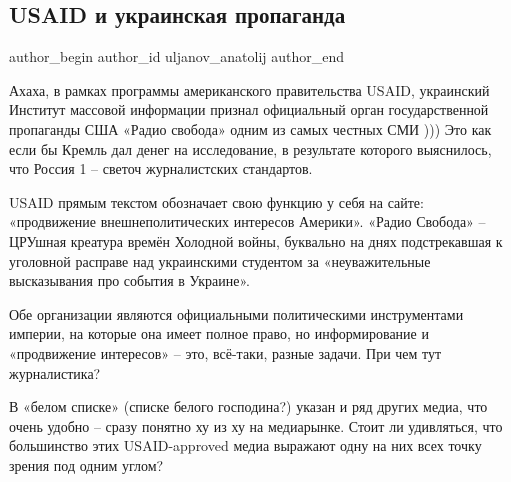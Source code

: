  
 
 
 
 
 
\subsection{USAID и украинская пропаганда}
\label{sec:25_11_2021.fb.uljanov_anatolij.1.usaid_ukr_propaganda}
 
\ifcmt
 author_begin
   author_id uljanov_anatolij
 author_end
\fi


Ахаха, в рамках программы американского правительства USAID, украинский
Институт массовой информации признал официальный орган государственной
пропаганды США «Радио свобода» одним из самых честных СМИ ))) Это как если бы
Кремль дал денег на исследование, в результате которого выяснилось, что Россия
1 – светоч журналистских стандартов.

USAID прямым текстом обозначает свою функцию у себя на сайте: «продвижение
внешнеполитических интересов Америки». «Радио Свобода» – ЦРУшная креатура
времён Холодной войны, буквально на днях подстрекавшая к уголовной расправе над
украинскими студентом за «неуважительные высказывания про события в Украине». 

Обе организации являются официальными политическими инструментами империи, на
которые она имеет полное право, но информирование и «продвижение интересов» –
это, всё-таки, разные задачи. При чем тут журналистика?

В «белом списке» (списке белого господина?) указан и ряд других медиа, что
очень удобно – сразу понятно ху из ху на медиарынке. Стоит ли удивляться, что
большинство этих USAID-approved медиа выражают одну на них всех точку зрения
под одним углом?


